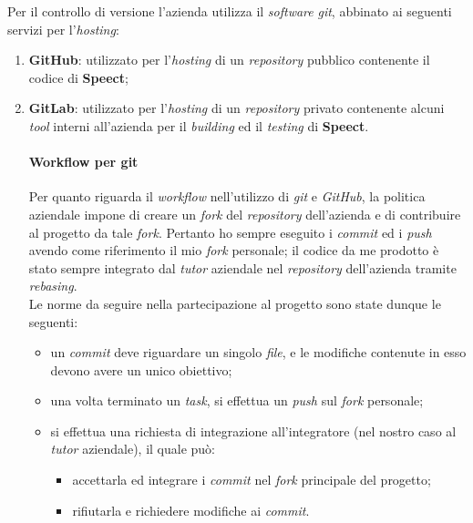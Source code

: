       Per il controllo di versione l'azienda utilizza il \textit{software} \textit{git}, abbinato ai seguenti servizi per l'\textit{hosting}: 
      \begin{enumerate}
	\item \textbf{GitHub}: utilizzato per l'\textit{hosting} di un \textit{repository} pubblico contenente il codice 
	      		       di \textbf{Speect};
	\item \textbf{GitLab}: utilizzato per l'\textit{hosting} di un \textit{repository} privato contenente alcuni 
	      		       \textit{tool} interni all'azienda  per il \textit{building} ed il \textit{testing} di \textbf{Speect}.

	\paragraph{Workflow per git}
        Per quanto riguarda il \textit{workflow} nell'utilizzo di \textit{git} e \textit{GitHub}, la politica aziendale impone
	di creare un \textit{fork} del \textit{repository} dell'azienda e di contribuire al progetto da tale \textit{fork}.
	Pertanto ho sempre eseguito i \textit{commit} ed i \textit{push} avendo come riferimento il mio \textit{fork} personale;
	il codice da me prodotto è stato sempre integrato dal \textit{tutor} aziendale nel \textit{repository} dell'azienda tramite
 	\textit{rebasing}. \\ Le norme da seguire nella partecipazione al progetto sono state dunque le seguenti:
        \begin{itemize}
           \item un \textit{commit} deve riguardare un singolo \textit{file}, e le modifiche contenute in esso
              devono avere un unico obiettivo;
           \item una volta terminato un \textit{task}, si effettua un \textit{push} sul \textit{fork} personale;
           \item si effettua una richiesta di integrazione all'integratore (nel nostro caso al \textit{tutor} aziendale), il quale
                 può:
                    \begin{itemize}
                      \item accettarla ed integrare i \textit{commit} nel \textit{fork} principale del progetto;
                      \item rifiutarla e richiedere modifiche ai \textit{commit}.
                    \end{itemize}
        \end{itemize}
        
      \end{enumerate}


